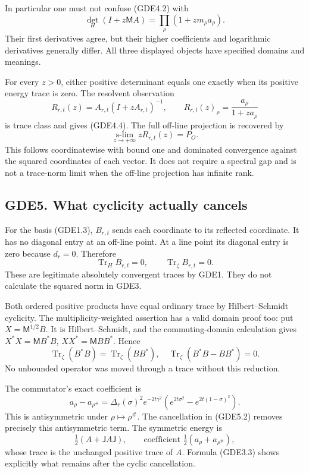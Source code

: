 In particular one must not confuse (GDE4.2) with \[
\det_H(I+z\mathsf M A)=\prod_\rho(1+zm_\rho a_\rho).
\tag{GDE4.8}
\] Their first derivatives agree, but their higher coefficients and
logarithmic derivatives generally differ. All three displayed objects
have specified domains and meanings.

For every \(z>0\), either positive determinant equals one exactly when
its positive energy trace is zero. The resolvent observation \[
R_{r,t}(z)=A_{r,t}(I+zA_{r,t})^{-1},\qquad
R_{r,t}(z)_\rho=\frac{a_\rho}{1+za_\rho}
\tag{GDE4.9}
\] is trace class and gives (GDE4.4). The full off-line projection is
recovered by \[
\operatorname*{s-lim}_{z\to+\infty}zR_{r,t}(z)=P_O.
\tag{GDE4.10}
\] This follows coordinatewise with bound one and dominated convergence
against the squared coordinates of each vector. It does not require a
spectral gap and is not a trace-norm limit when the off-line projection
has infinite rank.

\subsection{GDE5. What cyclicity actually
cancels}\label{gde5.-what-cyclicity-actually-cancels}

For the basis (GDE1.3), \(B_{r,t}\) sends each coordinate to its
reflected coordinate. It has no diagonal entry at an off-line point. At
a line point its diagonal entry is zero because \(d_r=0\). Therefore \[
\boxed{\operatorname{Tr}_H B_{r,t}=0,
\qquad\operatorname{Tr}_{\zeta}B_{r,t}=0.}
\tag{GDE5.1}
\] These are legitimate absolutely convergent traces by GDE1. They do
not calculate the squared norm in GDE3.

Both ordered positive products have equal ordinary trace by
Hilbert--Schmidt cyclicity. The multiplicity-weighted assertion has a
valid domain proof too: put \(X=\mathsf M^{1/2}B\). It is
Hilbert--Schmidt, and the commuting-domain calculation gives
\(X^*X=\mathsf M B^*B\), \(XX^*=\mathsf M BB^*\). Hence \[
\operatorname{Tr}_{\zeta}(B^*B)=\operatorname{Tr}_{\zeta}(BB^*),
\quad\operatorname{Tr}_{\zeta}(B^*B-BB^*)=0.
\tag{GDE5.2}
\] No unbounded operator was moved through a trace without this
reduction.

The commutator's exact coefficient is \[
a_\rho-a_{\rho^\#}
=\Delta_r(\sigma)^2e^{-2t\gamma^2}
\left(e^{2t\sigma^2}-e^{2t(1-\sigma)^2}\right).
\tag{GDE5.3}
\] This is antisymmetric under \(\rho\mapsto\rho^\#\). The cancellation
in (GDE5.2) removes precisely this antisymmetric term. The symmetric
energy is \[
\tfrac12(A+\mathsf JA\mathsf J),
\qquad\text{coefficient }\tfrac12(a_\rho+a_{\rho^\#}),
\tag{GDE5.4}
\] whose trace is the unchanged positive trace of \(A\). Formula
(GDE3.3) shows explicitly what remains after the cyclic cancellation.

